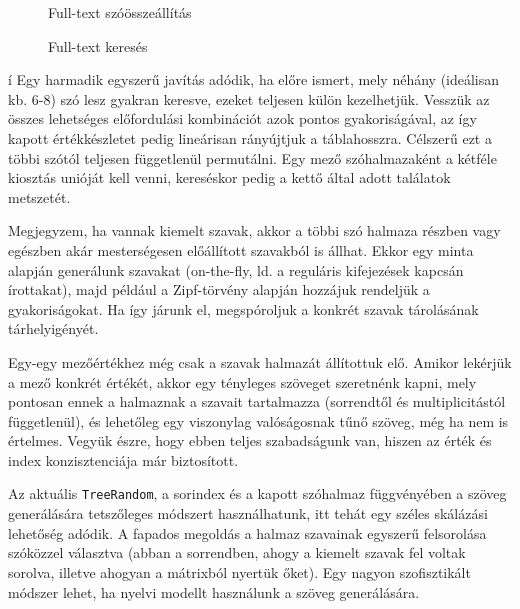 \documentclass[
    parspace,
    noindent,
    nohyp,
]{elteiktdk}[2023/04/10]
\begin{document}
\begin{figure}[H]
  \centering
  \hspace*{\fill}
  \begin{minipage}[t]{0.42\textwidth}
    
    \caption{Full-text szóösszeállítás}
  \end{minipage}
  \hspace*{\fill}
  \begin{minipage}[t]{0.42\textwidth}
    
    \caption{Full-text keresés}
  \end{minipage}
  \hspace*{\fill}
\end{figure}
í
Egy harmadik egyszerű javítás adódik,
ha előre ismert, mely néhány (ideálisan kb. 6-8) szó lesz gyakran keresve,
ezeket teljesen külön kezelhetjük.
Vesszük az összes lehetséges előfordulási kombinációt azok pontos gyakoriságával,
az így kapott értékkészletet pedig lineárisan rányújtjuk a táblahosszra.
Célszerű ezt a többi szótól teljesen függetlenül permutálni.
Egy mező szóhalmazaként a kétféle kiosztás unióját kell venni,
kereséskor pedig a kettő által adott találatok metszetét.

Megjegyzem, ha vannak kiemelt szavak, akkor a többi szó halmaza részben vagy egészben
akár mesterségesen előállított szavakból is állhat.
Ekkor egy minta alapján generálunk szavakat
(on-the-fly, ld. a reguláris kifejezések kapcsán írottakat),
majd például a Zipf-törvény alapján hozzájuk rendeljük a gyakoriságokat.
Ha így járunk el, megspóroljuk a konkrét szavak tárolásának tárhelyigényét.

Egy-egy mezőértékhez még csak a szavak halmazát állítottuk elő.
Amikor lekérjük a mező konkrét értékét, akkor egy tényleges szöveget szeretnénk kapni,
mely pontosan ennek a halmaznak a szavait tartalmazza (sorrendtől és multiplicitástól függetlenül),
és lehetőleg egy viszonylag valóságosnak tűnő szöveg, még ha nem is értelmes.
Vegyük észre, hogy ebben teljes szabadságunk van, hiszen az érték és index konzisztenciája már biztosított.

Az aktuális \texttt{TreeRandom}, a sorindex és a kapott szóhalmaz függvényében
a szöveg generálására tetszőleges módszert használhatunk,
itt tehát egy széles skálázási lehetőség adódik.
A fapados megoldás a halmaz szavainak egyszerű felsorolása szóközzel választva
(abban a sorrendben, ahogy a kiemelt szavak fel voltak sorolva, illetve ahogyan a mátrixból nyertük őket).
Egy nagyon szofisztikált módszer lehet, ha nyelvi modellt használunk a szöveg generálására.
\end{document}
